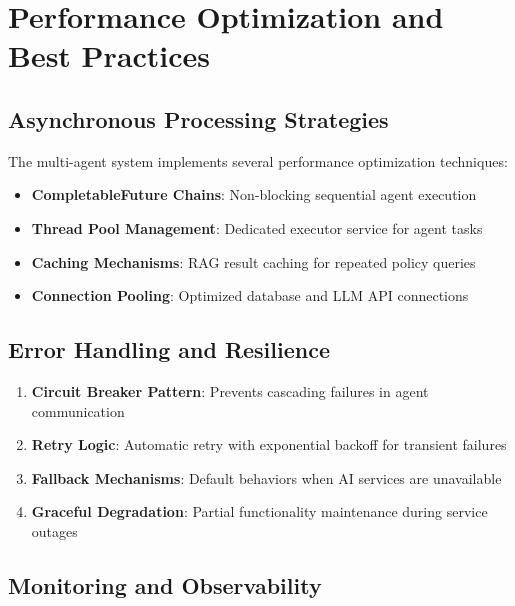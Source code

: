 \documentclass[12pt,a4paper]{article}
\begin{document}
\section{Performance Optimization and Best Practices}

\subsection{Asynchronous Processing Strategies}

The multi-agent system implements several performance optimization techniques:

\begin{itemize}
    \item \textbf{CompletableFuture Chains}: Non-blocking sequential agent execution
    \item \textbf{Thread Pool Management}: Dedicated executor service for agent tasks  
    \item \textbf{Caching Mechanisms}: RAG result caching for repeated policy queries
    \item \textbf{Connection Pooling}: Optimized database and LLM API connections
\end{itemize}

\subsection{Error Handling and Resilience}

\begin{tcolorbox}[colback=red!5!white,colframe=red!75!black,title=Error Handling Strategy]
\begin{enumerate}
    \item \textbf{Circuit Breaker Pattern}: Prevents cascading failures in agent communication
    \item \textbf{Retry Logic}: Automatic retry with exponential backoff for transient failures
    \item \textbf{Fallback Mechanisms}: Default behaviors when AI services are unavailable
    \item \textbf{Graceful Degradation}: Partial functionality maintenance during service outages
\end{enumerate}
\end{tcolorbox}

\subsection{Monitoring and Observability}
\end{document}
